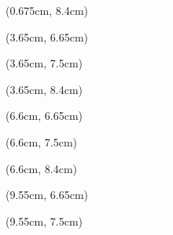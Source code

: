 \documentclass[aspectratio=3219]{beamer}
\begin{document}
\begin{textblock*}{3cm}(0.675cm, 8.4cm)
    \centering
    \textcolor{white}{\tiny \it {{country0}} \\}
\end{textblock*}

\begin{textblock*}{2.95cm}(3.65cm, 6.65cm)
    \centering
    \textcolor{white}{\tiny \bf{{award1}} \\}
\end{textblock*}

\begin{textblock*}{2.95cm}(3.65cm, 7.5cm)
    \centering
    \textcolor{white}{\scriptsize {{surname1}} {{name1}} \\}
\end{textblock*}

\begin{textblock*}{2.95cm}(3.65cm, 8.4cm)
    \centering
    \textcolor{white}{\tiny \it {{country1}} \\}
\end{textblock*}

\begin{textblock*}{2.95cm}(6.6cm, 6.65cm)
    \centering
    \textcolor{white}{\tiny \bf{{award2}}\\}
\end{textblock*}

\begin{textblock*}{2.95cm}(6.6cm, 7.5cm)
    \centering
    \textcolor{white}{\scriptsize {{surname2}} {{name2}} \\}
\end{textblock*}

\begin{textblock*}{2.95cm}(6.6cm, 8.4cm)
    \centering
    \textcolor{white}{\tiny \it {{country2}} \\}
\end{textblock*}

\begin{textblock*}{2.95cm}(9.55cm, 6.65cm)
    \centering
    \textcolor{white}{\tiny \bf{{award3}}\\}
\end{textblock*}

\begin{textblock*}{2.95cm}(9.55cm, 7.5cm)
    \centering
    \textcolor{white}{\scriptsize {{surname3}} {{name3}} \\}
\end{textblock*}
\end{document}
